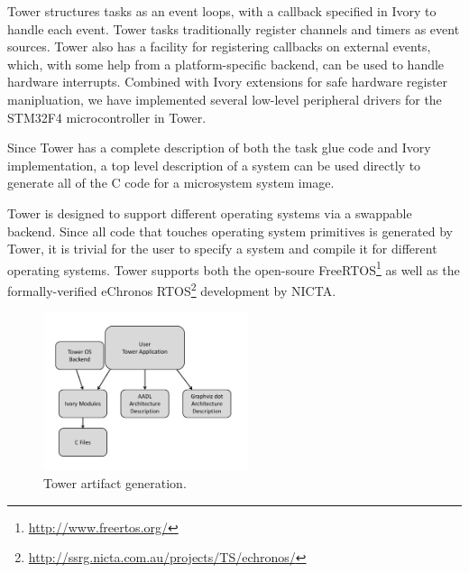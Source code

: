 
Tower structures tasks as an event loops,  with a callback specified in Ivory to
handle each  event. Tower  tasks traditionally register  channels and  timers as
event sources. Tower  also has a facility for registering  callbacks on external
events, which, with  some help from a platform-specific backend,  can be used to
handle hardware  interrupts. Combined  with Ivory  extensions for  safe hardware
register manipluation, we have  implemented several low-level peripheral drivers
for the STM32F4 microcontroller in Tower.  

Since Tower has a complete description of both the task glue code and Ivory
implementation, a top level description of a system can be used directly to
generate all of the C code for a microsystem system image.

Tower is designed to support different operating systems via a swappable
backend. Since all code that touches operating system primitives is generated by
Tower, it is trivial for the user to specify a system and compile it for
different operating systems. Tower supports both the open-soure
FreeRTOS\footnote{\url{http://www.freertos.org/}} as well as the
formally-verified eChronos
RTOS\footnote{\url{http://ssrg.nicta.com.au/projects/TS/echronos/}} development
by NICTA.

\begin{figure}
  \begin{center}
\includegraphics[width=6cm]{figures/tower-artifacts-dia}
  \end{center}
  \caption[Tower artifacts]{Tower artifact generation.}
\label{fig:towerArtifacts}
\end{figure}

